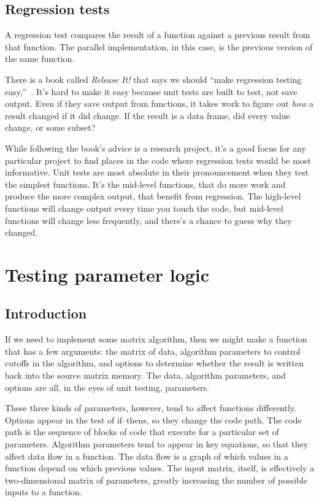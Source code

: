 \documentclass[fleqn,10pt]{olplainarticle}
\begin{document}
\subsection{Regression tests}
A regression test compares the result of a function against a previous
result from that function. The parallel implementation, in this case,
is the previous version of the same function.

There is a book called \emph{Release It!} that says we should
``make regression testing easy,''~\cite{nygard2018release}. It's hard to make it easy
because unit tests are built to test, not save output. Even if
they save output from functions, it takes work to figure out
\emph{how} a result changed if it did change. If the result
is a data frame, did every value change, or some subset?

While following the book's advice is a research project,
it's a good focus for any particular project to find places in the
code where regression tests would be most informative. Unit tests are
most absolute in their pronouncement when they test the simplest
functions. It's the mid-level functions, that do more work
and produce the more complex output, that benefit from regression.
The high-level functions will change output every time you touch
the code, but mid-level functions will change less frequently,
and there's a chance to guess why they changed.



\section{Testing parameter logic}\label{sec:parameter-logic}
\subsection{Introduction}\label{sec:parameter-introduction}
If we need to implement some matrix algorithm, then
we might make a function that has a few arguments: the matrix of data, algorithm parameters
to control cutoffs in the algorithm, and options to determine whether
the result is written back into the source matrix memory.
The data, algorithm parameters, and options are all, in the eyes of unit testing,
parameters.

These three kinds of parameters, however, tend to affect functions
differently. Options appear in the test of if--thens, so they change
the code path. The code path is the sequence of blocks of code that execute
for a particular set of parameters.
Algorithm parameters tend to appear in key equations, so that they
affect data flow in a function. The data flow is a graph
of which values in a function depend on which previous values.
The input matrix, itself, is effectively a two-dimensional matrix of
parameters, greatly increasing the number of possible inputs to a function.
\end{document}
